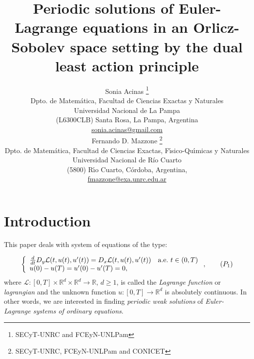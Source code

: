 \documentclass[twoside]{article}
\title{Periodic solutions of
Euler-Lagrange equations in an Orlicz-Sobolev space setting by the dual least action principle }
\author{Sonia Acinas \thanks{SECyT-UNRC and  FCEyN-UNLPam}\\
Dpto. de Matem\'atica, Facultad de Ciencias Exactas y Naturales\\
Universidad Nacional de La Pampa\\
(L6300CLB) Santa Rosa, La Pampa, Argentina\\
\url{sonia.acinas@gmail.com}\\[3mm]
Fernando D. Mazzone \thanks{SECyT-UNRC, FCEyN-UNLPam and CONICET}\\
Dpto. de Matem\'atica, Facultad de Ciencias Exactas, F\'{\i}sico-Qu\'{\i}micas y Naturales\\
Universidad Nacional de R\'{i}o Cuarto\\
(5800) R\'{\i}o Cuarto, C\'ordoba, Argentina,\\
\url{fmazzone@exa.unrc.edu.ar}
}
\date{}
\theoremstyle{remark}
\newcommand{\rr}{\mathbb{R}}
\renewcommand{\geq}{\geqslant}
\begin{document}
\maketitle
%
\begingroup%
    \renewcommand{\thefootnote}{}%
    \endgroup
%
%
%
%

\begin{abstract}


\end{abstract}






\pagestyle{fancy} \headheight 35pt \fancyhead{} \fancyfoot{}

\fancyfoot[C]{\thepage}  \fancyhead[CO]{\nouppercase{\section}}

\fancyhead[CO]{\nouppercase{\leftmark}}






\section{Introduction}


This paper deals with system  of equations of the type:

\begin{equation}\label{ProbPrin-gral}
    \left\{%
\begin{array}{ll}
  \frac{d}{dt} D_{y}\mathcal{L}(t,u(t),u'(t))= D_{x}\mathcal{L}(t,u(t),u'(t)) \quad \hbox{a.e.}\ t \in (0,T)\\
    u(0)-u(T)=u'(0)-u'(T)=0,
\end{array}%
\right. ,\tag{$P_1$}
\end{equation}
where $\mathcal{L}:[0,T]\times\rr^d\times\rr^d\to\rr$, $d\geq 1$, is called the \emph{Lagrange function} or \emph{lagrangian} and the unknown function  $u:[0,T]\to\rr^d$ is absolutely continuous. In other words, we are interested in  finding \emph{periodic weak solutions} of \emph{Euler-Lagrange systems of ordinary equations}.
\end{document}
